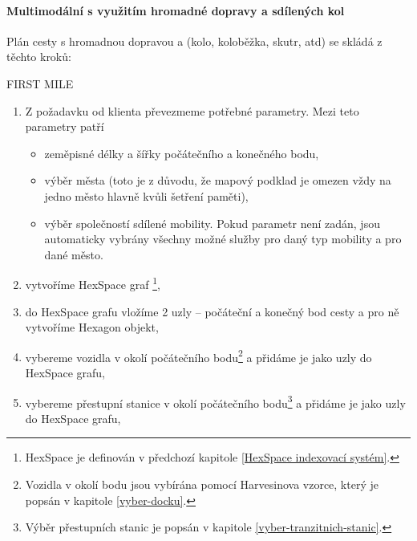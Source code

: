 \documentclass[thesis=M,czech]{FITthesis}[2019/12/23]
\theoremstyle{plain}
\theoremstyle{definition}
\begin{document}



\paragraph{Multimodální s využitím hromadné dopravy a sdílených kol}


Plán cesty s hromadnou dopravou a (kolo, koloběžka, skutr, atd) se skládá z těchto kroků:

FIRST MILE

\begin{enumerate}
	\item Z požadavku od klienta převezmeme potřebné parametry. Mezi teto parametry patří
	\begin{itemize}
		\item zeměpisné délky a šířky počátečního a konečného bodu,
		\item výběr města (toto je z důvodu, že mapový podklad je omezen vždy na jedno město hlavně kvůli šetření paměti),
		\item výběr společností sdílené mobility. Pokud parametr není zadán, jsou automaticky vybrány všechny možné služby pro daný typ mobility a pro dané město.
	\end{itemize}
	\item vytvoříme HexSpace graf \footnote{HexSpace je definován v předchozí kapitole \ref{HexSpace indexovací systém}.},
	\item do HexSpace grafu vložíme 2 uzly -- počáteční a konečný bod cesty a pro ně vytvoříme Hexagon objekt,
	\item vybereme vozidla v okolí počátečního bodu\footnote{Vozidla v okolí bodu jsou vybírána pomocí Harvesinova vzorce, který je popsán v kapitole \ref{vyber-docku}.} a přidáme je jako uzly do HexSpace grafu,
	\item vybereme přestupní stanice v okolí počátečního bodu\footnote{Výběr přestupních stanic je popsán v kapitole \ref{vyber-tranzitnich-stanic}.} a přidáme je jako uzly do HexSpace grafu, 

\end{enumerate}
\end{document}
